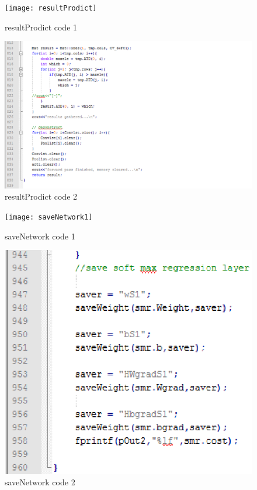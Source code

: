 \documentclass[article, onecolumn, draftclsnofoot,10pt, compsoc]{IEEEtran}
\begin{document}
\begin{figure}
  \caption{resultProdict code 1}
  \centering
  \texttt{[image: resultProdict]}
\end{figure}
\begin{figure}
  \caption{resultProdict code 2}
  \centering
  \includegraphics[width=\textwidth]{resultProdict2}
\end{figure}
\begin{figure}
  \caption{saveNetwork code 1}
  \centering
  \texttt{[image: saveNetwork1]}
\end{figure}
\begin{figure}
  \caption{saveNetwork code 2}
  \centering
  \includegraphics[width=\textwidth]{saveNetwork2}
\end{figure}
\end{document}
